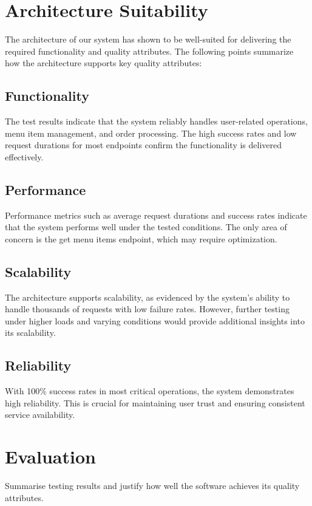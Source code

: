 \documentclass{article}
\begin{document}
\section{Architecture Suitability}

The architecture of our system has shown to be well-suited for delivering the required functionality and quality attributes. The following points summarize how the architecture supports key quality attributes:

\subsection{Functionality}

The test results indicate that the system reliably handles user-related operations, menu item management, and order processing. The high success rates and low request durations for most endpoints confirm the functionality is delivered effectively.

\subsection{Performance}

Performance metrics such as average request durations and success rates indicate that the system performs well under the tested conditions. The only area of concern is the get menu items endpoint, which may require optimization.

\subsection{Scalability}

The architecture supports scalability, as evidenced by the system's ability to handle thousands of requests with low failure rates. However, further testing under higher loads and varying conditions would provide additional insights into its scalability.

\subsection{Reliability}

With 100\% success rates in most critical operations, the system demonstrates high reliability. This is crucial for maintaining user trust and ensuring consistent service availability.

\section{Evaluation}
Summarise testing results and justify how well the software achieves its quality attributes.
\end{document}
